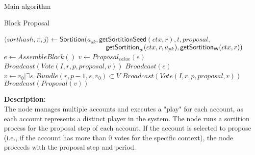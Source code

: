 \documentclass[10pt,a4paper]{article}
\begin{document}
\begin{section}{Main algorithm}
\begin{subsection}{Block Proposal}\label{ssect:blockproposal}

    \begin{algorithm}
        \begin{algorithmic}[1]

                \State $\langle sorthash, \pi, j\rangle\gets 
                \mathsf{Sortition}(
                    a_{sk}, 
                    \mathsf{getSortitionSeed}(ctx, r), 
                    t, 
                    proposal, $ \newline
                    ${}$ ${\hskip 5.2cm}\mathsf{getSortition}_w(ctx, r, a_{pk}), 
                    \mathsf{getSortition_W}(ctx, r)
                )$
                        \State $e \gets AssembleBlock()$
                        \State $v \gets Proposal_{value}(e)$
                        \State $Broadcast(Vote(I, r, p, proposal, v))$
                        \State $Broadcast(e)$
                    \Else
                        \State $v \gets v_0 | \exists s, Bundle(r,p-1,s,v_0) \subset V$
                        \State $Broadcast(Vote(I, r, p, proposal, v))$
                            \State $Broadcast(Proposal(v))$
                        \EndIf
                    \EndIf
                \EndIf
            \EndFor
        \EndFunction
        \end{algorithmic}
        \caption{\underline{Block proposal}}
    \end{algorithm}

\newpage
\noindent \textbf{Description:}\\
The node manages multiple accounts and executes a "play" for each account, 
as each account represents a distinct player in the system. The node runs a 
sortition process for the proposal step of each account. If the account is selected 
to propose (i.e., if the account has more than 0 votes for the specific context), 
the node proceeds with the proposal step and period.


\end{subsection}
\end{section}
\end{document}
